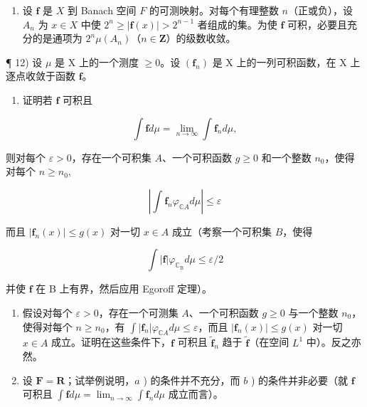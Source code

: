 \begin{enumerate}
\def\labelenumi{\arabic{enumi})}
\setcounter{enumi}{10}
\tightlist
\item
  设 \(\mathbf{f}\) 是 \(X\) 到 Banach 空间 \(F\) 的可测映射。对每个有理整数 \(n\)（正或负），设 \(A_{n}\) 为 \(x \in X\) 中使 \(2^{n} \geqslant |\mathbf{f}(x)| > 2^{n-1}\) 者组成的集。为使 \(\mathbf{f}\) 可积，必要且充分的是通项为 \(2^{n}\mu(A_{n})\)（\(n \in \mathbf{Z}\)）的级数收敛。
\end{enumerate}

¶ 12) 设 \(\mu\) 是 X 上的一个测度 \(\geqslant 0\)。设 \((\mathbf{f}_n)\) 是 X 上的一列可积函数，在 X 上逐点收敛于函数 \(\mathbf{f}\)。

\begin{enumerate}
\def\labelenumi{\alph{enumi})}
\tightlist
\item
  证明若 \(\mathbf{f}\) 可积且
\end{enumerate}

\[
\int \mathbf {f} d \mu = \lim _ {n \rightarrow \infty} \int \mathbf {f} _ {n} d \mu ,
\]

则对每个 \(\varepsilon > 0\)，存在一个可积集 \(A\)、一个可积函数 \(g \geqslant 0\) 和一个整数 \(n_0\)，使得对每个 \(n \geqslant n_0\),

\[
\left| \int \mathbf {f} _ {n} \varphi_ {\mathbb {C} A} d \mu \right| \leqslant \varepsilon
\]

而且 \(|\mathbf{f}_n(x)| \leqslant g(x)\) 对一切 \(x \in A\) 成立（考察一个可积集 \(B\)，使得

\[
\int | \mathbf {f} | \varphi_ {\mathbb {C} _ {\mathrm{B}}} d \mu \leqslant \varepsilon / 2
\]

并使 \(\mathbf{f}\) 在 B 上有界，然后应用 Egoroff 定理）。

\begin{enumerate}
\def\labelenumi{\alph{enumi})}
\setcounter{enumi}{1}
\item
  假设对每个 \(\varepsilon > 0\)，存在一个可测集 \(A\)、一个可积函数 \(g \geqslant 0\) 与一个整数 \(n_0\)，使得对每个 \(n \geqslant n_0\)，有 \(\int |\mathbf{f}_n| \varphi_{\mathbb{C}A} d\mu \leqslant \varepsilon\)，而且 \(|\mathbf{f}_n(x)| \leqslant g(x)\) 对一切 \(x \in A\) 成立。证明在这些条件下，\(\mathbf{f}\) 可积且 \(\widetilde{\mathbf{f}}_n\) 趋于 \(\widetilde{\mathbf{f}}\)（在空间 \(L^1\) 中）。反之亦然。
\item
  设 \(\mathbf{F} = \mathbf{R}\)；试举例说明，\(a\) ) 的条件并不充分，而 \(b\) ) 的条件并非必要（就 \(\mathbf{f}\) 可积且 \(\int \mathbf{f} d\mu = \lim_{n \to \infty} \int \mathbf{f}_n d\mu\) 成立而言）。
\end{enumerate}

